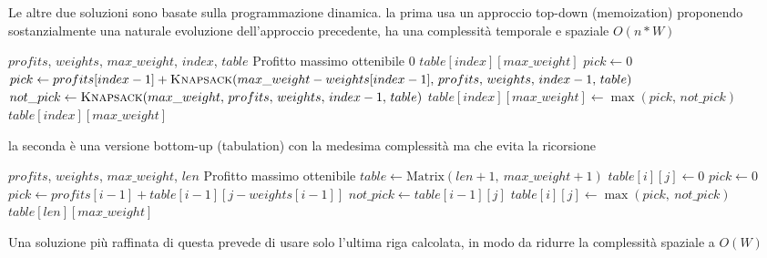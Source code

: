 \documentclass[11pt]{article}
\begin{document}
Le altre due soluzioni sono basate sulla programmazione dinamica. 
la prima usa un approccio top-down (memoization) proponendo sostanzialmente una naturale evoluzione dell'approccio precedente, 
ha una complessità temporale e spaziale $O(n*W)$

\begin{algorithm}[H]
\caption{Knapsack 0/1 Top-Down (memoization)}\label{alg:knapsack-memo}
\begin{algorithmic}
\Require $profits$, $weights$, $max\_weight$, $index$, $table$
\Ensure Profitto massimo ottenibile
    \State \Return $0$
\EndIf
{}
    \State \Return $table[index][max\_weight]$
\EndIf
\State $pick \gets 0$
    \State $pick \gets profits[index-1] + \Call{Knapsack}{max\_weight - weights[index-1],\, profits,\, weights,\, index-1,\, table}$
\EndIf
\State $not\_pick \gets \Call{Knapsack}{max\_weight,\, profits,\, weights,\, index-1,\, table}$
\State $table[index][max\_weight] \gets \max(pick,\, not\_pick)$
\State \Return $table[index][max\_weight]$
\end{algorithmic}
\end{algorithm}

la seconda è una versione bottom-up (tabulation) con la medesima complessità ma che evita la ricorsione
\begin{algorithm}[H]
\caption{Knapsack 0/1 Bottom-Up (tabulation)}\label{alg:knapsack-tab}
\begin{algorithmic}
\Require $profits$, $weights$, $max\_weight$, $len$
\Ensure Profitto massimo ottenibile
\State $table \gets \text{Matrix}(len+1,\ max\_weight+1)$
            \State $table[i][j] \gets 0$
        \Else
            \State $pick \gets 0$
                \State $pick \gets profits[i-1] + table[i-1][j - weights[i-1]]$
            \EndIf
            \State $not\_pick \gets table[i-1][j]$
            \State $table[i][j] \gets \max(pick,\ not\_pick)$
        \EndIf
    \EndFor
\EndFor
\State \Return $table[len][max\_weight]$
\end{algorithmic}
\end{algorithm}

Una soluzione più raffinata di questa prevede di usare solo l'ultima riga calcolata, in modo da ridurre la complessità spaziale a $O(W)$
\end{document}
